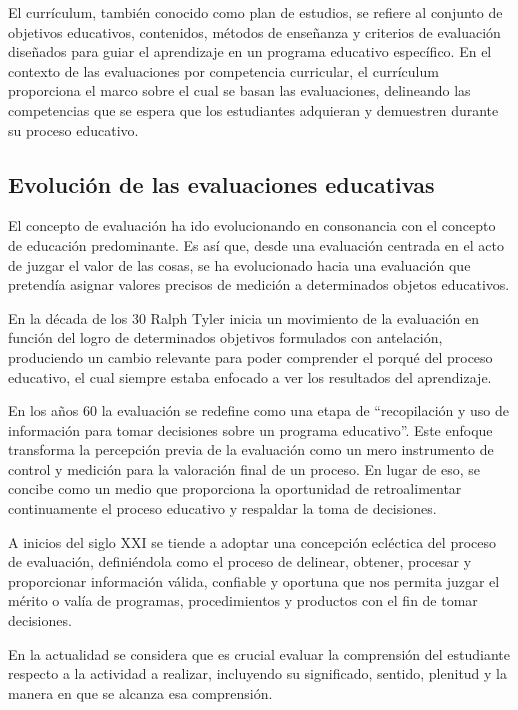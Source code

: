 El currículum, también conocido como plan de estudios, se refiere al conjunto de objetivos educativos, contenidos, métodos de enseñanza y criterios de evaluación diseñados para guiar el aprendizaje en un programa educativo específico. En el contexto de las evaluaciones por competencia curricular, el currículum proporciona el marco sobre el cual se basan las evaluaciones, delineando las competencias que se espera que los estudiantes adquieran y demuestren durante su proceso educativo.

\subsection{Evolución de las evaluaciones educativas}

El concepto de evaluación ha ido evolucionando en consonancia con el concepto de educación predominante. Es así que, desde una evaluación centrada en el acto de juzgar el valor de las cosas, se ha evolucionado hacia una evaluación que pretendía asignar valores precisos de medición a determinados objetos educativos.

En la década de los 30 Ralph Tyler inicia un movimiento de la evaluación en función del logro de determinados objetivos formulados con antelación, produciendo un cambio relevante para poder comprender el porqué del proceso educativo, el cual siempre estaba enfocado a ver los resultados del aprendizaje.

En los años 60 la evaluación se redefine como una etapa de ``recopilación y uso de información para tomar decisiones sobre un programa educativo''. Este enfoque transforma la percepción previa de la evaluación como un mero instrumento de control y medición para la valoración final de un proceso. En lugar de eso, se concibe como un medio que proporciona la oportunidad de retroalimentar continuamente el proceso educativo y respaldar la toma de decisiones.

A inicios del siglo XXI se tiende a adoptar una concepción ecléctica del proceso de evaluación, definiéndola como el proceso de delinear, obtener, procesar y proporcionar información válida, confiable y oportuna que nos permita juzgar el mérito o valía de programas, procedimientos y productos con el fin de tomar decisiones.

En la actualidad se considera que es crucial evaluar la comprensión del estudiante respecto a la actividad a realizar, incluyendo su significado, sentido, plenitud y la manera en que se alcanza esa comprensión.

